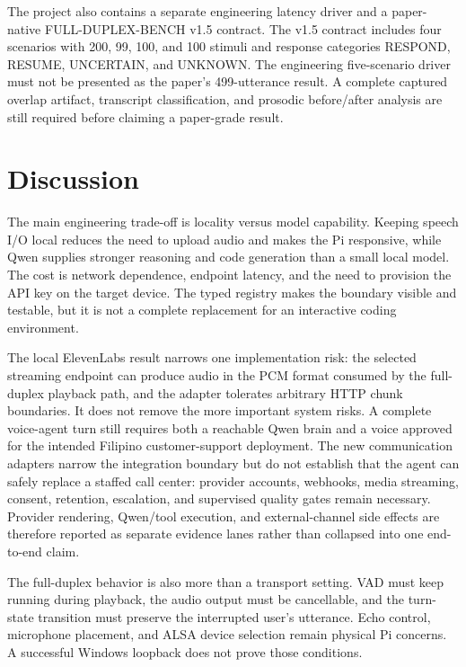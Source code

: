 \documentclass[sigconf,nonacm]{acmart}
\begin{document}
The project also contains a separate engineering latency driver and a
paper-native FULL-DUPLEX-BENCH v1.5 contract. The v1.5 contract includes four
scenarios with 200, 99, 100, and 100 stimuli and response categories RESPOND,
RESUME, UNCERTAIN, and UNKNOWN. The engineering five-scenario driver must not
be presented as the paper's 499-utterance result. A complete captured overlap
artifact, transcript classification, and prosodic before/after analysis are
still required before claiming a paper-grade result.

\section{Discussion}

The main engineering trade-off is locality versus model capability. Keeping
speech I/O local reduces the need to upload audio and makes the Pi responsive,
while Qwen supplies stronger reasoning and code generation than a small local
model. The cost is network dependence, endpoint latency, and the need to
provision the API key on the target device. The typed registry makes the
boundary visible and testable, but it is not a complete replacement for an
interactive coding environment.

The local ElevenLabs result narrows one implementation risk: the selected
streaming endpoint can produce audio in the PCM format consumed by the
full-duplex playback path, and the adapter tolerates arbitrary HTTP chunk
boundaries. It does not remove the more important system risks. A complete
voice-agent turn still requires both a reachable Qwen brain and a voice
approved for the intended Filipino customer-support deployment. The new
communication adapters narrow the integration boundary but do not establish
that the agent can safely replace a staffed call center: provider accounts,
webhooks, media streaming, consent, retention, escalation, and supervised
quality gates remain necessary. Provider rendering, Qwen/tool execution, and
external-channel side effects are therefore reported as separate evidence
lanes rather than collapsed into one end-to-end claim.

The full-duplex behavior is also more than a transport setting. VAD must keep
running during playback, the audio output must be cancellable, and the
turn-state transition must preserve the interrupted user's utterance. Echo
control, microphone placement, and ALSA device selection remain physical Pi
concerns. A successful Windows loopback does not prove those conditions.
\end{document}
